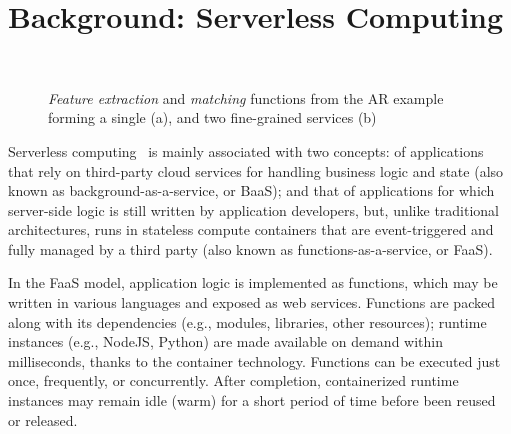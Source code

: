 \section{Background: Serverless Computing}\label{sec:background}


\begin{figure*}[tbp]
	\centering
	\captionsetup[subfigure]{width=0.48\linewidth}
	~
	\captionsetup[subfigure]{width=0.52\linewidth}
	\caption{\textit{Feature extraction} and \textit{matching} functions from the AR example forming a single (a), and two fine-grained services (b)} \label{fig:Mobile_Computation_Offloading}
\end{figure*}

Serverless computing~\cite{Lloyd18serverless,Roberts:2018} is mainly associated with two concepts: of applications that rely on third-party cloud services for handling business logic and state (also known as background-as-a-service, or BaaS); and that of applications for which server-side logic is still written by application developers, but, unlike traditional architectures, runs in stateless compute containers that are event-triggered
and fully managed by a third party (also known as functions-as-a-service, or FaaS).

In the FaaS model, application logic is implemented as functions, which may be written in various languages and exposed as web services. Functions are packed along with its dependencies (e.g., modules, libraries, other resources); runtime instances (e.g., NodeJS, Python) are made available on demand within milliseconds, thanks to the container technology. Functions can be executed just once, frequently, or concurrently. After completion, containerized runtime instances may remain idle (warm) for a short period of time before been reused or released.

